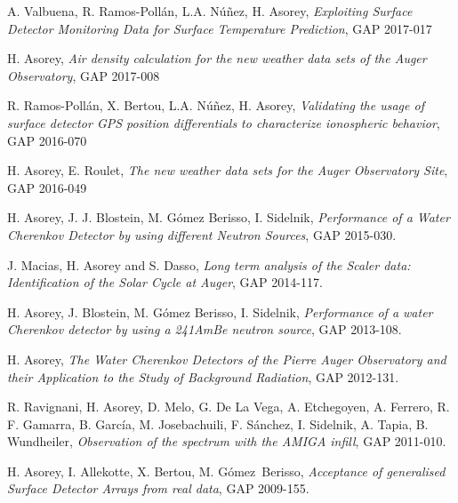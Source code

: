 \noindent
\begin{etaremune}

\item {} A. Valbuena, R. Ramos-Pollán, L.A. Núñez, H. Asorey, {\emph{Exploiting Surface Detector Monitoring Data for Surface Temperature Prediction}}, GAP 2017-017

\item {} H. Asorey, {\emph{Air density calculation for the new weather data sets of the Auger Observatory}}, GAP 2017-008

\item {} R. Ramos-Pollán, X. Bertou, L.A. Núñez, H. Asorey, {\emph{Validating the usage of surface detector GPS position differentials to characterize ionospheric behavior}}, GAP 2016-070

\item {} H. Asorey, E. Roulet, {\emph{The new weather data sets for the Auger Observatory Site}}, GAP 2016-049

\item {} H. Asorey, J. J. Blostein, M. Gómez Berisso, I. Sidelnik, {\emph{Performance of a Water Cherenkov Detector by using different Neutron Sources}}, GAP 2015-030.

\item {} J. Macias, H. Asorey and S. Dasso, {\emph{Long term analysis of the Scaler data: Identification of the Solar Cycle at Auger}}, GAP 2014-117.

\item {} H. Asorey, J. Blostein, M. Gómez Berisso, I. Sidelnik, {\emph{Performance of a water Cherenkov detector by using a 241AmBe neutron source}}, GAP 2013-108.

\item {} H. Asorey, {\emph{The Water Cherenkov Detectors of the Pierre Auger Observatory and their Application to the Study of Background Radiation}}, GAP 2012-131.

\item {} R. Ravignani, H. Asorey, D. Melo, G. De La Vega, A. Etchegoyen, A. Ferrero, R. F. Gamarra, B. García, M. Josebachuili, F. Sánchez, I. Sidelnik, A. Tapia, B. Wundheiler, {\emph{Observation of the spectrum with the AMIGA infill}}, GAP 2011-010.

\item {}H. Asorey, I. Allekotte, X. Bertou, M. Gómez~Berisso, {\emph{Acceptance of generalised Surface Detector Arrays from real data}}, GAP 2009-155.


\end{etaremune}
